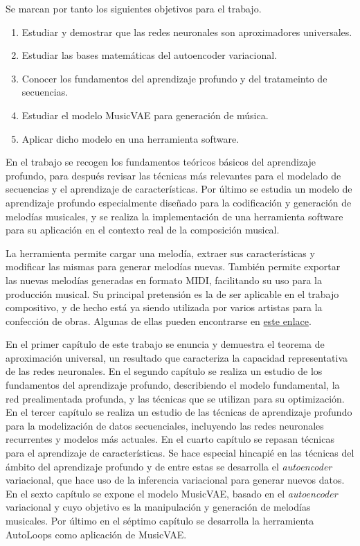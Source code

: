 Se marcan por tanto los siguientes objetivos para el trabajo.

\begin{enumerate}
\item Estudiar y demostrar que las redes neuronales son aproximadores universales.
\item Estudiar las bases matemáticas del autoencoder variacional.
\item Conocer los fundamentos del aprendizaje profundo y del tratameinto de secuencias.
\item Estudiar el modelo MusicVAE para generación de música.
\item Aplicar dicho modelo en una herramienta software.
\end{enumerate}

En el trabajo se recogen los fundamentos teóricos básicos del aprendizaje profundo, para después revisar las técnicas más relevantes para el modelado de secuencias y el aprendizaje de características. Por último se estudia un modelo de aprendizaje profundo especialmente diseñado para la codificación y generación de melodías musicales, y se realiza la implementación de una herramienta software para su aplicación en el contexto real de la composición musical.

La herramienta permite cargar una melodía, extraer sus características y modificar las mismas para generar melodías nuevas. También permite exportar las nuevas melodías generadas en formato MIDI, facilitando su uso para la producción musical. Su principal pretensión es la de ser aplicable en el trabajo compositivo, y de hecho está ya siendo utilizada por varios artistas para la confección de obras. Algunas de ellas pueden encontrarse en \href{https://soundcloud.com/user-860813847/sets/autoloops}{este enlace}.

En el primer capítulo de este trabajo se enuncia y demuestra el teorema de aproximación universal, un resultado que caracteriza la capacidad representativa de las redes neuronales. En el segundo capítulo se realiza un estudio de los fundamentos del aprendizaje profundo, describiendo el modelo fundamental, la red prealimentada profunda, y las técnicas que se utilizan para su optimización. En el tercer capítulo se realiza un estudio de las técnicas de aprendizaje profundo para la modelización de datos secuenciales, incluyendo las redes neuronales recurrentes y modelos más actuales. En el cuarto capítulo se repasan técnicas para el aprendizaje de características. Se hace especial hincapié en las técnicas del ámbito del aprendizaje profundo y de entre estas se desarrolla el \textit{autoencoder} variacional, que hace uso de la inferencia variacional para generar nuevos datos. En el sexto capítulo se expone el modelo MusicVAE, basado en el \textit{autoencoder} variacional y cuyo objetivo es la manipulación y generación de melodías musicales. Por último en el séptimo capítulo se desarrolla la herramienta AutoLoops como aplicación de MusicVAE.

